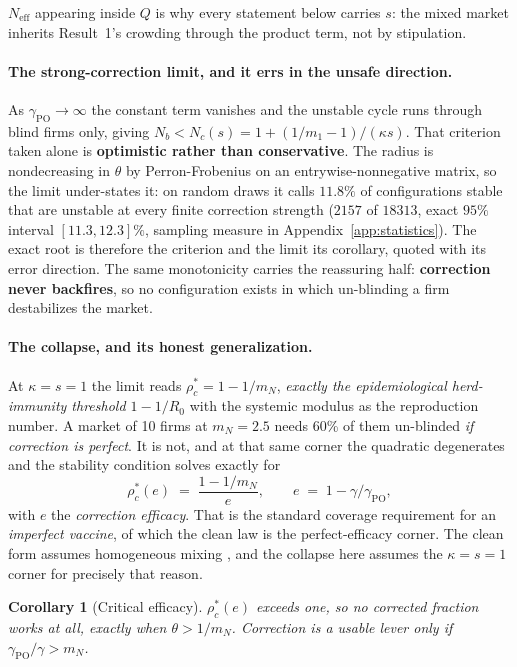 \documentclass{article}
\theoremstyle{plain}
\newtheorem{corollary}[theorem]{Corollary}
\theoremstyle{definition}
\newcommand{\Neff}{N_{\mathrm{eff}}}
\newcommand{\mN}{m_N}
\begin{document}
$\Neff$ appearing inside $Q$ is why every statement below carries $s$: the mixed market inherits Result~1's crowding through the product term, not by stipulation.

\paragraph{The strong-correction limit, and it errs in the unsafe direction.}
As $\gamma_{\mathrm{PO}}\to\infty$ the constant term vanishes and the unstable cycle runs through blind firms only, giving $N_b < N_c(s) = 1 + (1/m_1 - 1)/(\kappa s)$. That criterion taken alone is \textbf{optimistic rather than conservative}. The radius is nondecreasing in $\theta$ by Perron-Frobenius on an entrywise-nonnegative matrix, so the limit under-states it: on random draws it calls $11.8\%$ of configurations stable that are unstable at every finite correction strength ($2157$ of $18313$, exact $95\%$ interval $[11.3,12.3]\%$, sampling measure in Appendix~\ref{app:statistics}). The exact root is therefore the criterion and the limit its corollary, quoted with its error direction. The same monotonicity carries the reassuring half: \textbf{correction never backfires}, so no configuration exists in which un-blinding a firm destabilizes the market.

\paragraph{The collapse, and its honest generalization.}
At $\kappa = s = 1$ the limit reads $\rho_c^{*} = 1 - 1/\mN$, \emph{exactly the epidemiological herd-immunity threshold $1-1/R_0$} with the systemic modulus as the reproduction number. A market of 10 firms at $\mN = 2.5$ needs 60\% of them un-blinded \emph{if correction is perfect}. It is not, and at that same corner the quadratic degenerates and the stability condition solves exactly for
\begin{equation}
\rho_c^{*}(e) \;=\; \frac{1 - 1/\mN}{e}, \qquad e \;=\; 1 - \gamma/\gamma_{\mathrm{PO}},
\end{equation}
with $e$ the \emph{correction efficacy}. That is the standard coverage requirement for an \emph{imperfect vaccine}, of which the clean law is the perfect-efficacy corner. The clean form assumes homogeneous mixing \citep{fine2011}, and the collapse here assumes the $\kappa=s=1$ corner for precisely that reason.

\begin{corollary}[Critical efficacy]
\label{cor:efficacy}
$\rho_c^{*}(e)$ exceeds one, so no corrected fraction works at all, exactly when $\theta > 1/\mN$. Correction is a usable lever only if $\gamma_{\mathrm{PO}}/\gamma > \mN$.
\end{corollary}
\end{document}
